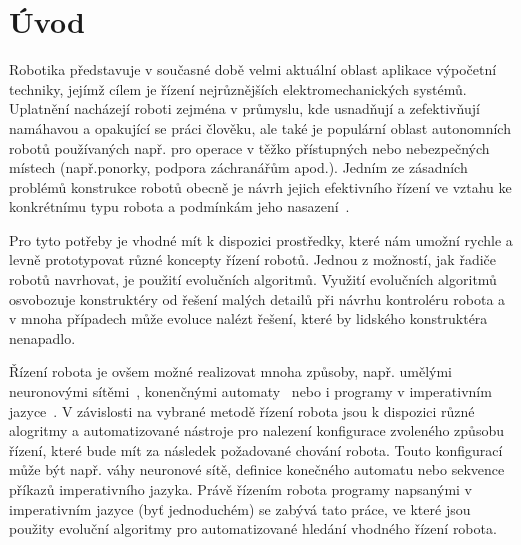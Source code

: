 \chapter{Úvod}





Robotika představuje v současné době velmi aktuální oblast aplikace výpočetní techniky, jejímž cílem je řízení nejrůznějších
elektromechanických systémů.
Uplatnění nacházejí roboti zejména v průmyslu, kde usnadňují a zefektivňují namáhavou a
opakující se práci člověku, ale také je populární oblast autonomních robotů používaných např. pro operace v těžko přístupných
nebo nebezpečných místech (např.ponorky, podpora záchranářům apod.).
Jedním ze zásadních problémů konstrukce robotů obecně je návrh jejich efektivního řízení ve vztahu ke konkrétnímu typu robota a podmínkám jeho nasazení~\cite{Bongard2013}.

Pro tyto potřeby je vhodné mít k dispozici prostředky, které nám umožní rychle a levně prototypovat různé koncepty řízení
robotů.
Jednou z možností, jak řadiče robotů navrhovat, je použití evolučních algoritmů.
Využití evolučních algoritmů osvobozuje konstruktéry od řešení malých detailů při návrhu kontroléru robota a v mnoha případech může evoluce nalézt řešení, které by lidského konstruktéra nenapadlo.

Řízení robota je ovšem možné realizovat mnoha způsoby, např. umělými neuronovými sítěmi~\cite{Reil2002}, konenčnými automaty~\cite{Hodgins1996} nebo i programy v imperativním jazyce~\cite{Wolff2007}.
V závislosti na vybrané metodě řízení robota jsou k dispozici různé alogritmy a automatizované nástroje pro nalezení konfigurace zvoleného způsobu řízení, které bude mít za následek požadované chování robota.
Touto konfigurací může být např. váhy neuronové sítě, definice konečného automatu nebo sekvence příkazů imperativního jazyka.
Právě řízením robota programy napsanými v imperativním jazyce (byť jednoduchém) se zabývá tato práce, ve které jsou použity evoluční algoritmy pro automatizované hledání vhodného řízení robota.

